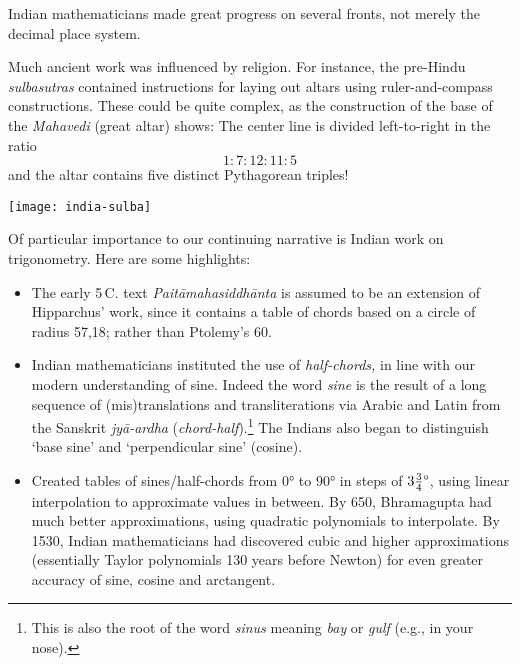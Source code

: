 \label{pg:Mahavedi}

Indian mathematicians made great progress on several fronts, not merely the decimal place system.\par
\begin{minipage}[t]{0.56\linewidth}\vspace{0pt}
	Much ancient work was influenced by religion. For instance, the pre-Hindu \emph{sulbasutras} contained instructions for laying out altars using ruler-and-compass constructions. These could be quite complex, as the construction of the base of the \emph{Mahavedi} (great altar) shows: The center line is divided left-to-right in the ratio
	\[
		1:7:12:11:5
	\]
	and the altar contains five distinct Pythagorean triples!
\end{minipage}
\hfill
\begin{minipage}[t]{0.42\linewidth}\vspace{0pt}
	\flushright
	\texttt{[image: india-sulba]}
\end{minipage}
\medbreak

Of particular importance to our continuing narrative is Indian work on trigonometry. Here are some highlights:
\begin{itemize}
  \item The early 5\th\,C.{} text \emph{Paitāmahasiddhānta} is assumed to be an extension of Hipparchus' work, since it contains a table of chords based on a circle of radius 57,18; rather than Ptolemy's 60.
  \item Indian mathematicians instituted the use of \emph{half-chords,} in line with our modern understanding of sine. Indeed the word \emph{sine} is the result of a long sequence of (mis)translations and transliterations via Arabic and Latin from the Sanskrit \emph{jyā-ardha} (\emph{chord-half}).\footnote{
  This is also the root of the word \emph{sinus} meaning \emph{bay} or \emph{gulf} (e.g., in your nose).
 } The Indians also began to distinguish `base sine' and `perpendicular sine' (cosine).
  \item Created tables of sines/half-chords from \ang{0} to \ang{90} in steps of $\ang{3\frac 34}$, using linear interpolation to approximate values in between. By 650, Bhramagupta had much better approximations, using quadratic polynomials to interpolate. By 1530, Indian mathematicians had discovered cubic and higher approximations (essentially Taylor polynomials 130 years before Newton) for even greater accuracy of sine, cosine and arctangent.
\end{itemize}

